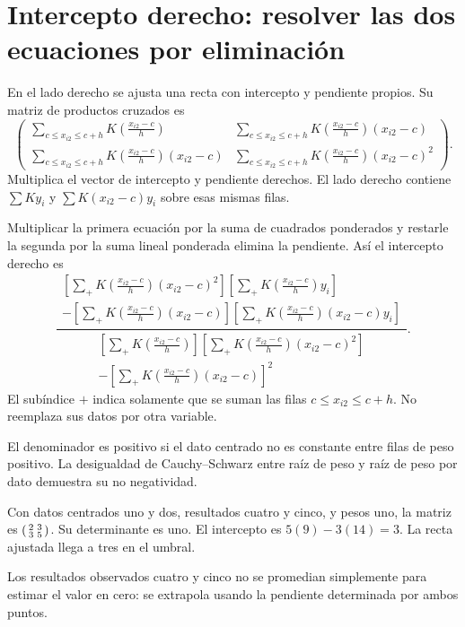 \documentclass[11pt,a4paper]{article}
\begin{document}
\section{Intercepto derecho: resolver las dos ecuaciones por eliminación}\label{unidad26}
En el lado derecho se ajusta una recta
con intercepto y pendiente propios.
Su matriz de productos cruzados es
\[
\begin{pmatrix}
\sum_{c\le x_{i2}\le c+h}K(\frac{x_{i2}-c}{h})
&
\sum_{c\le x_{i2}\le c+h}K(\frac{x_{i2}-c}{h})(x_{i2}-c)\\
\sum_{c\le x_{i2}\le c+h}K(\frac{x_{i2}-c}{h})(x_{i2}-c)
&
\sum_{c\le x_{i2}\le c+h}K(\frac{x_{i2}-c}{h})(x_{i2}-c)^2
\end{pmatrix}.
\]
Multiplica el vector de intercepto y pendiente derechos.
El lado derecho contiene
\(\sum K y_i\) y \(\sum K(x_{i2}-c)y_i\)
sobre esas mismas filas.

Multiplicar la primera ecuación por la suma
de cuadrados ponderados y restarle la segunda
por la suma lineal ponderada elimina la pendiente.
Así el intercepto derecho es
\[
\frac{
\begin{gathered}
\left[\sum_+ K(\frac{x_{i2}-c}{h})(x_{i2}-c)^2\right]
\left[\sum_+ K(\frac{x_{i2}-c}{h})y_i\right]
\\
-\left[\sum_+ K(\frac{x_{i2}-c}{h})(x_{i2}-c)\right]
\left[\sum_+ K(\frac{x_{i2}-c}{h})(x_{i2}-c)y_i\right]
\end{gathered}
}{
\begin{gathered}
\left[\sum_+K(\frac{x_{i2}-c}{h})\right]
\left[\sum_+K(\frac{x_{i2}-c}{h})(x_{i2}-c)^2\right]
\\
-\left[\sum_+K(\frac{x_{i2}-c}{h})(x_{i2}-c)\right]^2
\end{gathered}
}.
\]
El subíndice \(+\) indica solamente que se suman
las filas \(c\le x_{i2}\le c+h\).
No reemplaza sus datos por otra variable.

El denominador es positivo si el dato centrado
no es constante entre filas de peso positivo.
La desigualdad de Cauchy--Schwarz entre
raíz de peso y raíz de peso por dato
demuestra su no negatividad.

\begin{ejemplo}
Con datos centrados uno y dos, resultados cuatro y cinco,
y pesos uno, la matriz es
\(\begin{psmallmatrix}2&3\\3&5\end{psmallmatrix}\).
Su determinante es uno.
El intercepto es \(5(9)-3(14)=3\).
La recta ajustada llega a tres en el umbral.
\end{ejemplo}
Los resultados observados cuatro y cinco
no se promedian simplemente para estimar
el valor en cero: se extrapola usando
la pendiente determinada por ambos puntos.
\end{document}
